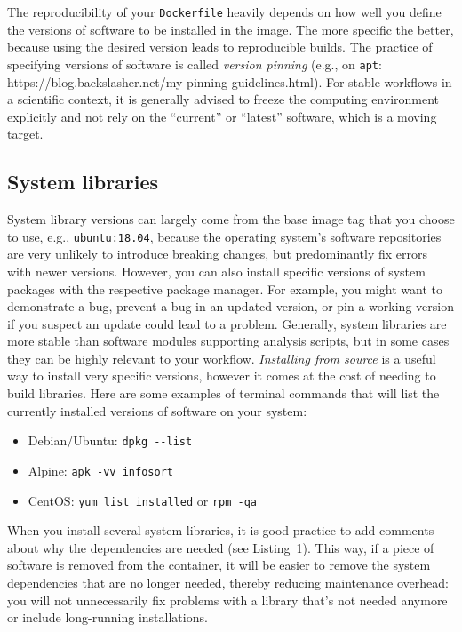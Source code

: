 \documentclass[10pt,letterpaper]{article}
\providecommand{\tightlist}{%
  \setlength{\itemsep}{0pt}\setlength{\parskip}{0pt}}
\begin{document}
The reproducibility of your \texttt{Dockerfile} heavily depends on how
well you define the versions of software to be installed in the image.
The more specific the better, because using the desired version leads to
reproducible builds. The practice of specifying versions of software is
called \emph{version pinning} (e.g., on \texttt{apt}:
https://blog.backslasher.net/my-pinning-guidelines.html). For stable
workflows in a scientific context, it is generally advised to freeze the
computing environment explicitly and not rely on the ``current'' or
``latest'' software, which is a moving target.

\hypertarget{system-libraries}{%
\subsection{System libraries}\label{system-libraries}}

System library versions can largely come from the base image tag that
you choose to use, e.g., \texttt{ubuntu:18.04}, because the operating
system's software repositories are very unlikely to introduce breaking
changes, but predominantly fix errors with newer versions. However, you
can also install specific versions of system packages with the
respective package manager. For example, you might want to demonstrate a
bug, prevent a bug in an updated version, or pin a working version if
you suspect an update could lead to a problem. Generally, system
libraries are more stable than software modules supporting analysis
scripts, but in some cases they can be highly relevant to your workflow.
\emph{Installing from source} is a useful way to install very specific
versions, however it comes at the cost of needing to build libraries.
Here are some examples of terminal commands that will list the currently
installed versions of software on your system:

\begin{itemize}
\tightlist
\item
  Debian/Ubuntu: \texttt{dpkg\ -\/-list}
\item
  Alpine: \texttt{apk\ -vv\ info\textbar{}sort}
\item
  CentOS: \texttt{yum\ list\ installed} or \texttt{rpm\ -qa}
\end{itemize}

When you install several system libraries, it is good practice to add
comments about why the dependencies are needed (see Listing~1). This
way, if a piece of software is removed from the container, it will be
easier to remove the system dependencies that are no longer needed,
thereby reducing maintenance overhead: you will not unnecessarily fix
problems with a library that's not needed anymore or include
long-running installations.
\end{document}
